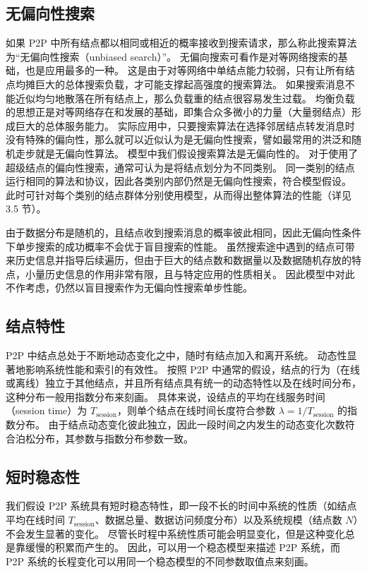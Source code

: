 \documentclass{thuthesis}
\begin{document}
\subsection{无偏向性搜索}

如果 P2P 中所有结点都以相同或相近的概率接收到搜索请求，那么称此搜索算法为“无偏向性搜索（unbiased search）”。
无偏向搜索可看作是对等网络搜索的基础，也是应用最多的一种。
这是由于对等网络中单结点能力较弱，只有让所有结点均摊巨大的总体搜索负载，才可能支撑起高强度的搜索算法。
如果搜索消息不能近似均匀地散落在所有结点上，那么负载重的结点很容易发生过载。
均衡负载的思想正是对等网络存在和发展的基础，即集合众多微小的力量（大量弱结点）形成巨大的总体服务能力。
实际应用中，只要搜索算法在选择邻居结点转发消息时没有特殊的偏向性，那么就可以近似认为是无偏向性搜索，譬如最常用的洪泛和随机走步就是无偏向性算法。
模型中我们假设搜索算法是无偏向性的。
对于使用了超级结点的偏向性搜索，通常可认为是将结点划分为不同类别。
同一类别的结点运行相同的算法和协议，因此各类别内部仍然是无偏向性搜索，符合模型假设。
此时可针对每个类别的结点群体分别使用模型，从而得出整体算法的性能（详见 3.5 节）。

由于数据分布是随机的，且结点收到搜索消息的概率彼此相同，因此无偏向性条件下单步搜索的成功概率不会优于盲目搜索的性能。
虽然搜索途中遇到的结点可带来历史信息并指导后续遍历，但由于巨大的结点数和数据量以及数据随机存放的特点，小量历史信息的作用非常有限，且与特定应用的性质相关。
因此模型中对此不作考虑，仍然以盲目搜索作为无偏向性搜索单步性能。


\subsection{结点特性}

P2P 中结点总处于不断地动态变化之中，随时有结点加入和离开系统。
动态性显著地影响系统性能和索引的有效性。
按照 P2P 中通常的假设，结点的行为（在线或离线）独立于其他结点，并且所有结点具有统一的动态特性以及在线时间分布，这种分布一般用指数分布来刻画。
具体来说，设结点的平均在线服务时间（session time）为 $T_{\text{session}}$，则单个结点在线时间长度符合参数 $\lambda = 1/T_{\text{session}}$ 的指数分布。
由于结点动态变化彼此独立，因此一段时间之内发生的动态变化次数符合泊松分布，其参数与指数分布参数一致。


\subsection{短时稳态性}

我们假设 P2P 系统具有短时稳态特性，即一段不长的时间中系统的性质（如结点平均在线时间 $T_{\text{session}}$、数据总量、数据访问频度分布）以及系统规模（结点数 $N$）不会发生显著的变化。
尽管长时程中系统性质可能会明显变化，但是这种变化总是靠缓慢的积累而产生的。
因此，可以用一个稳态模型来描述 P2P 系统，而 P2P 系统的长程变化可以用同一个稳态模型的不同参数取值点来刻画。
\end{document}
